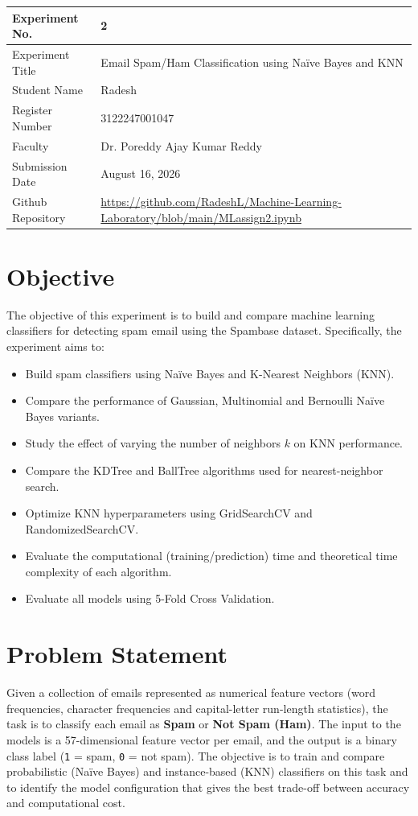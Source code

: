 \documentclass[12pt,a4paper]{article}
\begin{document}
\begin{tabular}{|p{4cm}|p{11cm}|}
\hline
Experiment No. & 2 \\ \hline
Experiment Title & Email Spam/Ham Classification using Na\"ive Bayes and KNN \\ \hline
Student Name & Radesh \\ \hline
Register Number & 3122247001047\\ \hline
Faculty & Dr. Poreddy Ajay Kumar Reddy \\ \hline
Submission Date & August 16, 2026 \\ \hline
Github Repository & \url{https://github.com/RadeshL/Machine-Learning-Laboratory/blob/main/MLassign2.ipynb}\\ \hline
\end{tabular}

\section{Objective}
The objective of this experiment is to build and compare machine learning classifiers for detecting spam email using the Spambase dataset. Specifically, the experiment aims to:
\begin{itemize}
\item Build spam classifiers using Na\"ive Bayes and K-Nearest Neighbors (KNN).
\item Compare the performance of Gaussian, Multinomial and Bernoulli Na\"ive Bayes variants.
\item Study the effect of varying the number of neighbors $k$ on KNN performance.
\item Compare the KDTree and BallTree algorithms used for nearest-neighbor search.
\item Optimize KNN hyperparameters using GridSearchCV and RandomizedSearchCV.
\item Evaluate the computational (training/prediction) time and theoretical time complexity of each algorithm.
\item Evaluate all models using 5-Fold Cross Validation.
\end{itemize}

\section{Problem Statement}
Given a collection of emails represented as numerical feature vectors (word frequencies, character frequencies and capital-letter run-length statistics), the task is to classify each email as \textbf{Spam} or \textbf{Not Spam (Ham)}. The input to the models is a 57-dimensional feature vector per email, and the output is a binary class label (\texttt{1} = spam, \texttt{0} = not spam). The objective is to train and compare probabilistic (Na\"ive Bayes) and instance-based (KNN) classifiers on this task and to identify the model configuration that gives the best trade-off between accuracy and computational cost.
\end{document}
